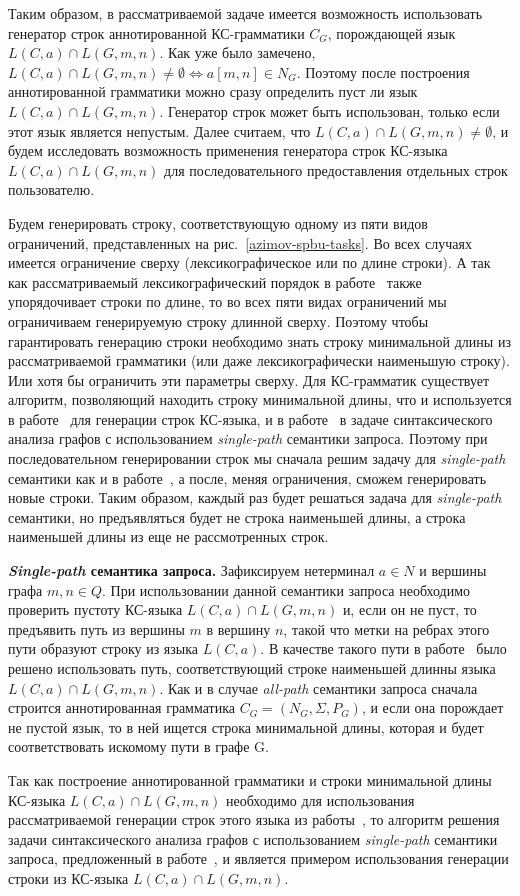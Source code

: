 Таким образом, в рассматриваемой задаче имеется возможность использовать генератор строк аннотированной КС-грамматики $C_{G}$, порождающей язык $L(C,a) \cap L(G,m,n)$. Как уже было замечено, $L(C,a) \cap L(G,m,n) \ne \emptyset \Leftrightarrow a[m,n] \in N_{G}$. Поэтому после построения аннотированной грамматики можно сразу определить пуст ли язык $L(C,a) \cap L(G,m,n)$. Генератор строк может быть использован, только если этот язык является непустым. Далее считаем, что $L(C,a) \cap L(G,m,n) \ne \emptyset$, и будем исследовать возможность применения генератора строк КС-языка $L(C,a) \cap L(G,m,n)$ для последовательного предоставления отдельных строк пользователю.

Будем генерировать строку, соответствующую одному из пяти видов ограничений, представленных на рис.~\ref{azimov-spbu-tasks}. Во всех случаях имеется ограничение сверху (лексикографическое или по длине строки). А так как рассматриваемый лексикографический порядок в работе~\cite{azimov-spbu-Okhotin} также упорядочивает строки по длине, то во всех пяти видах ограничений мы ограничиваем генерируемую строку длинной сверху. Поэтому чтобы гарантировать генерацию строки необходимо знать строку минимальной длины из рассматриваемой грамматики (или даже лексикографически наименьшую строку). Или хотя бы ограничить эти параметры сверху. Для КС-грамматик существует алгоритм, позволяющий находить строку минимальной длины, что и используется в работе~\cite{azimov-spbu-Okhotin} для генерации строк КС-языка, и в работе~\cite{azimov-spbu-hellings2} в задаче синтаксического анализа графов с использованием \textit{single-path} семантики запроса. Поэтому при последовательном генерировании строк мы сначала решим задачу для \textit{single-path} семантики как и в работе~\cite{azimov-spbu-hellings2}, а после, меняя ограничения, сможем генерировать новые строки. Таким образом, каждый раз будет решаться задача для \textit{single-path} семантики, но предъявляться будет не строка наименьшей длины, а строка наименьшей длины из еще не рассмотренных строк.

\textbf{\textit{Single-path} семантика запроса.} Зафиксируем нетерминал $a \in N$ и вершины графа $m, n \in Q$. При использовании данной семантики запроса необходимо проверить пустоту КС-языка $L(C,a) \cap L(G,m,n)$ и, если он не пуст, то предъявить путь из вершины $m$ в вершину $n$, такой что метки на ребрах этого пути образуют строку из языка $L(C,a)$. В качестве такого пути в работе~\cite{azimov-spbu-hellings2} было решено использовать путь, соответствующий строке наименьшей длинны языка $L(C,a) \cap L(G,m,n)$. Как и в случае \textit{all-path} семантики запроса сначала строится аннотированная грамматика $C_{G} = (N_{G}, \Sigma, P_{G})$, и если она порождает не пустой язык, то в ней ищется строка минимальной длины, которая и будет соответствовать искомому пути в графе G.

Так как построение аннотированной грамматики и строки минимальной длины КС-языка $L(C,a) \cap L(G,m,n)$ необходимо для использования рассматриваемой генерации строк этого языка из работы~\cite{azimov-spbu-Okhotin}, то алгоритм решения задачи синтаксического анализа графов с использованием \textit{single-path} семантики запроса, предложенный в работе~\cite{azimov-spbu-hellings2}, и является примером использования генерации строки из КС-языка $L(C,a) \cap L(G,m,n)$.